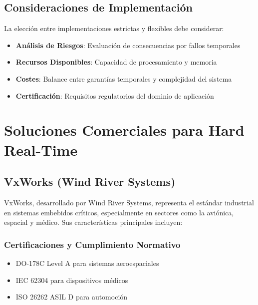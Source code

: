     \subsection{Consideraciones de Implementación}
        La elección entre implementaciones estrictas y flexibles debe considerar:
        \begin{itemize}
            \item \textbf{Análisis de Riesgos}: Evaluación de consecuencias por fallos temporales
            \item \textbf{Recursos Disponibles}: Capacidad de procesamiento y memoria
            \item \textbf{Costes}: Balance entre garantías temporales y complejidad del sistema
            \item \textbf{Certificación}: Requisitos regulatorios del dominio de aplicación
        \end{itemize}

\newpage
\section{Soluciones Comerciales para Hard Real-Time}

    \subsection{VxWorks (Wind River Systems)}
        VxWorks, desarrollado por Wind River Systems, representa el estándar industrial en sistemas embebidos críticos, especialmente en sectores como la aviónica, espacial y médico. Sus características principales incluyen:

        \subsubsection{Certificaciones y Cumplimiento Normativo}
            \begin{itemize}
                \item DO-178C Level A para sistemas aeroespaciales
                \item IEC 62304 para dispositivos médicos
                \item ISO 26262 ASIL D para automoción
            \end{itemize}
